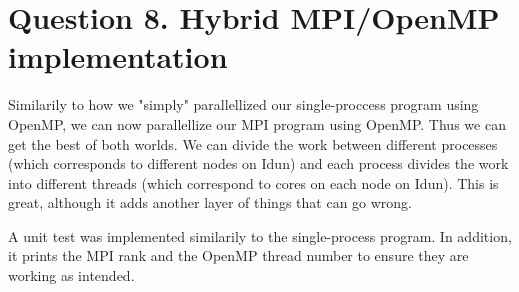 \documentclass[12pt]{article}
\begin{document}
\section{Question 8. Hybrid MPI/OpenMP implementation}
Similarily to how we "simply" parallellized our single-proccess program using OpenMP, we can now parallellize our MPI program using OpenMP. Thus we can get the best of both worlds.
We can divide the work between different processes (which corresponds to different nodes on Idun) and each process divides the work into different threads 
(which correspond to cores on each node on Idun). This is great, although it adds another layer of things that can go wrong. 

A unit test was implemented similarily to the single-process program. In addition, it prints the MPI rank and the OpenMP thread number to ensure they are working as intended.
\end{document}
